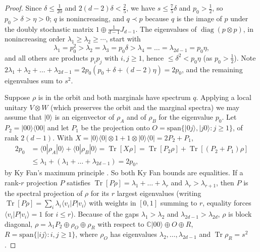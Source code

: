 \documentclass[11pt]{amsart}
\theoremstyle{definition}
\theoremstyle{remark}
\numberwithin{equation}{section}
\newcommand{\C}{\mathbb{C}}
\newcommand{\Tr}{\operatorname{Tr}}
\newcommand{\diag}{\operatorname{diag}}
\begin{document}
\begin{proof}
Since $\delta\le\frac1{20}$ and $2(d-2)\delta<\frac25$, we have $s\le\frac75\delta$ and $p_0>\frac12$, so
$p_0>\delta>\eta>0$; $q$ is nonincreasing, and $q\prec p$ because $q$ is the image of $p$ under the doubly
stochastic matrix $1\oplus\frac1{d-1}J_{d-1}$. The eigenvalues of $\diag(p\otimes p)$, in nonincreasing
order $\lambda_1\ge\lambda_2\ge\cdots$, start with
\[
  \lambda_1=p_0^2>\lambda_2=\lambda_3=p_0\delta>\lambda_4=\dots=\lambda_{2d-1}=p_0\eta ,
\]
and all others are products $p_ip_j$ with $i,j\ge1$, hence $\le\delta^2<p_0\eta$ (as $p_0>\frac12$). Note
$2\lambda_1+\lambda_2+\dots+\lambda_{2d-1}=2p_0(p_0+\delta+(d-2)\eta)=2p_0$, and the remaining eigenvalues
sum to $s^2$.

Suppose $\rho$ is in the orbit and both marginals have spectrum $q$. Applying a local unitary $V\otimes W$
(which preserves the orbit and the marginal spectra) we may assume that $|0\rangle$ is an eigenvector of
$\rho_A$ and of $\rho_B$ for the eigenvalue $p_0$. Let $P_2=|00\rangle\langle00|$ and let $P_1$ be the
projection onto $O=\mathrm{span}\{|0j\rangle,|j0\rangle:j\ge1\}$, of rank $2(d-1)$. With
$X=|0\rangle\langle0|\otimes1+1\otimes|0\rangle\langle0|=2P_2+P_1$,
\begin{align*}
  2p_0&=\langle0|\rho_A|0\rangle+\langle0|\rho_B|0\rangle=\Tr[X\rho]=\Tr[P_2\rho]+\Tr[(P_2+P_1)\rho]\\
  &\le\lambda_1+(\lambda_1+\dots+\lambda_{2d-1})=2p_0 ,
\end{align*}
by Ky Fan's maximum principle \cite{Bhatia1997}. So both Ky Fan bounds are equalities. If a
rank-$r$ projection $P$ satisfies $\Tr[P\rho]=\lambda_1+\dots+\lambda_r$ and $\lambda_r>\lambda_{r+1}$, then
$P$ is the spectral projection of $\rho$ for its $r$ largest eigenvalues (writing
$\Tr[P\rho]=\sum_i\lambda_i\langle v_i|P|v_i\rangle$ with weights in $[0,1]$ summing to $r$, equality forces
$\langle v_i|P|v_i\rangle=1$ for $i\le r$). Because of the gaps $\lambda_1>\lambda_2$ and
$\lambda_{2d-1}>\lambda_{2d}$, $\rho$ is block diagonal,
$\rho=\lambda_1P_2\oplus\rho_O\oplus\rho_R$ with respect to
$\C|00\rangle\oplus O\oplus R$, $R=\mathrm{span}\{|ij\rangle:i,j\ge1\}$, where $\rho_O$ has eigenvalues
$\lambda_2,\dots,\lambda_{2d-1}$ and $\Tr\rho_R=s^2$.


\end{proof}
\end{document}
